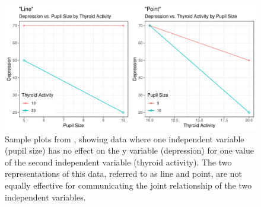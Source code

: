 \documentclass[letterpaper]{ar-1col}\usepackage[]{graphicx}\usepackage[]{color}
\newenvironment{knitrout}{}{} %
\begin{document}
\begin{knitrout}
\color{fgcolor}\begin{figure}
\includegraphics[width=\textwidth]{figure/shahcarpenter-1} \caption[Sample plots from \citet{shahConceptualLimitationsComprehending1995}, showing data where one independent variable (pupil size) has no effect on the y variable (depression) for one value of the second independent variable (thyroid activity)]{Sample plots from \citet{shahConceptualLimitationsComprehending1995}, showing data where one independent variable (pupil size) has no effect on the y variable (depression) for one value of the second independent variable (thyroid activity). The two representations of this data, referred to as line and point, are not equally effective for communicating the joint relationship of the two independent variables. }\label{fig:shahcarpenter}
\end{figure}


\end{knitrout}
\end{document}
